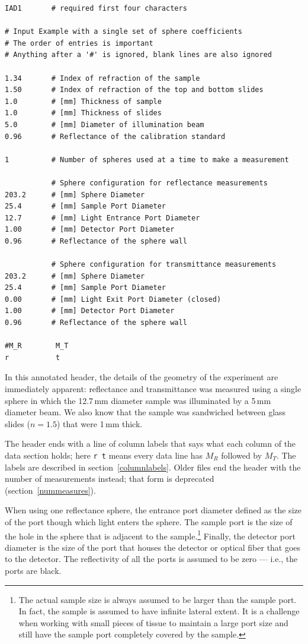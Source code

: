 \documentclass{article}
\begin{document}
\begin{center}
\begin{minipage}{9.5cm}
\scriptsize
\begin{verbatim}
IAD1       # required first four characters

# Input Example with a single set of sphere coefficients
# The order of entries is important
# Anything after a '#' is ignored, blank lines are also ignored

1.34       # Index of refraction of the sample
1.50       # Index of refraction of the top and bottom slides
1.0        # [mm] Thickness of sample
1.0        # [mm] Thickness of slides
5.0        # [mm] Diameter of illumination beam
0.96       # Reflectance of the calibration standard

1          # Number of spheres used at a time to make a measurement

           # Sphere configuration for reflectance measurements
203.2      # [mm] Sphere Diameter
25.4       # [mm] Sample Port Diameter
12.7       # [mm] Light Entrance Port Diameter
1.00       # [mm] Detector Port Diameter
0.96       # Reflectance of the sphere wall

           # Sphere configuration for transmittance measurements
203.2      # [mm] Sphere Diameter
25.4       # [mm] Sample Port Diameter
0.00       # [mm] Light Exit Port Diameter (closed)
1.00       # [mm] Detector Port Diameter
0.96       # Reflectance of the sphere wall

#M_R        M_T
r           t
\end{verbatim}
\end{minipage}
\end{center}
In this annotated header, the details of the
geometry of the experiment are immediately apparent: reflectance
and transmittance was measured using a single sphere in which 
the 12.7\,mm diameter sample was illuminated by a 5\,mm diameter beam.
We also know that the sample was sandwiched between glass slides
($n=1.5$) that were 1\,mm thick.

The header ends with a line of column labels that says what each column of
the data section holds; here \texttt{r t} means every data line has $M_R$
followed by $M_T$.  The labels are described in section~\ref{columnlabels}.
Older files end the header with the number of measurements instead; that
form is deprecated (section~\ref{nummeasures}).

When using one reflectance sphere, the entrance port diameter defined as the size of the
port though which light enters the sphere.  The sample port is the size of the hole
in the sphere that is adjacent to the sample.\footnote[1]{The actual sample size is
always assumed to be larger than the sample port.  In fact, the sample is assumed
to have infinite lateral extent.  It is a challenge when working with small pieces
of tissue to maintain a large port size and still have the sample port completely
covered by the sample.}  Finally, the detector port diameter
is the size of the port that houses the detector or optical fiber that goes to the
detector.  The reflectivity of all the ports is assumed to be zero --- i.e., the 
ports are black.
\end{document}
